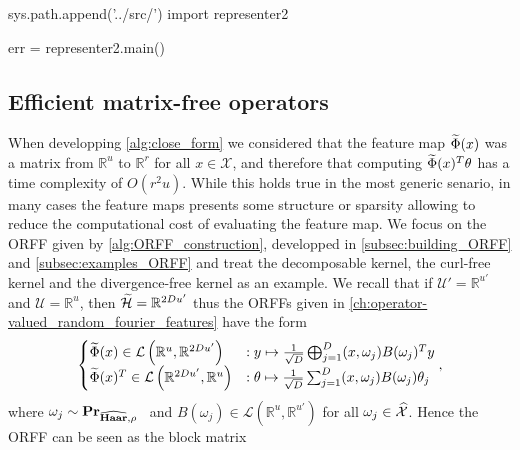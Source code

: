 \begin{pycode}[representer2]
sys.path.append('../src/')
import representer2

err = representer2.main()
\end{pycode}


\subsection{Efficient matrix-free operators}
When developping \cref{alg:close_form} we considered that the feature map $\widetilde{\Phi}(x)$ was a matrix from $\mathbb{R}^u$ to $\mathbb{R}^{r}$ for all $x\in\mathcal{X}$, and therefore that computing $\widetilde{\Phi}(x)^T \theta$ has a time complexity of $O(r^2u)$. While this holds true in the most generic senario, in many cases the feature maps presents some structure or sparsity allowing to reduce the computational cost of evaluating the feature map. We focus on the \acl{ORFF} given by \cref{alg:ORFF_construction}, developped in \cref{subsec:building_ORFF} and \cref{subsec:examples_ORFF} and treat the decomposable kernel, the curl-free kernel and the divergence-free kernel as an example. We recall that if $\mathcal{U}'=\mathbb{R}^{u'}$ and $\mathcal{U}=\mathbb{R}^u$, then $\widetilde{\mathcal{H}}=\mathbb{R}^{2Du'}$ thus the \acl{ORFF}s given in \cref{ch:operator-valued_random_fourier_features} have the form
\begin{dmath*}
\begin{cases}\tildePhi{\omega}(x) \in\mathcal{L}\left(\mathbb{R}^u, \mathbb{R}^{2Du'}\right) &:  y \mapsto \frac{1}{\sqrt{D}}\Vect_{j=1}^D\pairing{x, \omega_j}B(\omega_j)^T y \\ \tildePhi{\omega}(x)^T \in\mathcal{L}\left(\mathbb{R}^{2Du'}, \mathbb{R}^u\right) &: \theta \mapsto \frac{1}{\sqrt{D}} \sum_{j=1}^D \pairing{x, \omega_j}B(\omega_j)\theta_j \end{cases},
\end{dmath*}
where $\omega_j\sim{\mathbf{{Pr}}}_{\widehat{\mathbf{Haar}}, \rho}$ \iid~and $B(\omega_j)\in\mathcal{L}\left(\mathbb{R}^u,\mathbb{R}^{u'}\right)$ for all $\omega_j\in\widehat{\mathcal{X}}$. Hence the \acl{ORFF} can be seen as the block matrix
